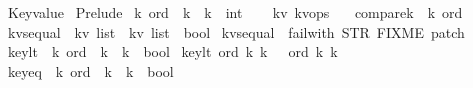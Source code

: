 %
\begin{isabellebody}%
%
%
\isadelimtheory
%
\endisadelimtheory
%
\isatagtheory
{}\isamarkupfalse%
\ Key{\isacharunderscore}value\isanewline
{}\ Prelude\isanewline
{}%
\endisatagtheory
{\isafoldtheory}%
%
\isadelimtheory
\isanewline
%
\endisadelimtheory
\isanewline
\isanewline
\isanewline
\isanewline
\isanewline
\isanewline
\isanewline
\isanewline
\isanewline
{}\isamarkupfalse%
\ {\isacharprime}k\ ord\ {\isacharequal}\ {\isachardoublequoteopen}{\isacharprime}k\ {\isasymRightarrow}\ {\isacharprime}k\ {\isasymRightarrow}\ int{\isachardoublequoteclose}\isanewline
\ \ \isanewline
\isanewline
\isanewline
\isanewline
{}\isamarkupfalse%
\ {\isacharparenleft}{\isacharprime}k{\isacharcomma}{\isacharprime}v{\isacharparenright}\ kv{\isacharunderscore}ops\ {\isacharequal}\isanewline
\ \ compare{\isacharunderscore}k\ {\isacharcolon}{\isacharcolon}\ {\isachardoublequoteopen}{\isacharprime}k\ ord{\isachardoublequoteclose}\isanewline
\ \ \isanewline
\isanewline
\isanewline
\isanewline
{}\isamarkupfalse%
\ kvs{\isacharunderscore}equal\ {\isacharcolon}{\isacharcolon}\ {\isachardoublequoteopen}{\isacharparenleft}{\isacharprime}k{\isacharasterisk}{\isacharprime}v{\isacharparenright}\ list\ {\isasymRightarrow}\ {\isacharparenleft}{\isacharprime}k{\isacharasterisk}{\isacharprime}v{\isacharparenright}\ list\ {\isasymRightarrow}\ bool{\isachardoublequoteclose}\ \isanewline
{\isachardoublequoteopen}kvs{\isacharunderscore}equal\ {\isacharequal}\ failwith\ {\isacharparenleft}STR\ {\isacharprime}{\isacharprime}FIXME\ patch{\isacharprime}{\isacharprime}{\isacharparenright}{\isachardoublequoteclose}\isanewline
\isanewline
\isanewline
\isanewline
\isanewline
\isanewline
\isanewline
\isanewline
\isanewline
\isanewline
{}\isamarkupfalse%
\ key{\isacharunderscore}lt\ {\isacharcolon}{\isacharcolon}\ {\isachardoublequoteopen}{\isacharprime}k\ ord\ {\isasymRightarrow}\ {\isacharprime}k\ {\isasymRightarrow}\ {\isacharprime}k\ {\isasymRightarrow}\ bool{\isachardoublequoteclose}\ \isanewline
{\isachardoublequoteopen}key{\isacharunderscore}lt\ ord\ k{}\ k{}\ {\isacharequal}\ {\isacharparenleft}\ ord\ k{}\ k{}\ {\isacharless}\ {}{\isacharparenright}{\isachardoublequoteclose}\isanewline
\isanewline
{}\isamarkupfalse%
\ key{\isacharunderscore}eq\ {\isacharcolon}{\isacharcolon}\ {\isachardoublequoteopen}{\isacharprime}k\ ord\ {\isasymRightarrow}\ {\isacharprime}k\ {\isasymRightarrow}\ {\isacharprime}k\ {\isasymRightarrow}\ bool{\isachardoublequoteclose}\ \isanewline

\end{isabellebody}
